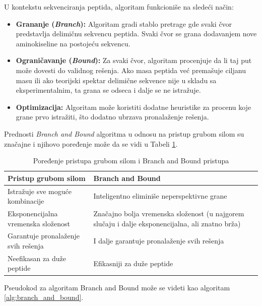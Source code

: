 \documentclass[12pt,oneside]{memoir}
\begin{document}
U kontekstu sekvenciranja peptida, algoritam funkcioniše na sledeći način:
\begin{itemize}
    \item \textbf{Grananje (\emph{Branch}):} Algoritam gradi stablo pretrage gde svaki čvor predstavlja delimičnu sekvencu peptida. Svaki čvor se grana dodavanjem nove aminokiseline na postojeću sekvencu.
    \item \textbf{Ograničavanje (\emph{Bound}):} Za svaki čvor, algoritam procenjuje da li taj put može dovesti do validnog rešenja. Ako masa peptida već premašuje ciljanu masu ili ako teorijski spektar delimične sekvence nije u skladu sa eksperimentalnim, ta grana se odseca i dalje se ne istražuje.
    \item \textbf{Optimizacija:} Algoritam može koristiti dodatne heuristike za procenu koje grane prvo istražiti, što dodatno ubrzava pronalaženje rešenja.
\end{itemize}

Prednosti \emph{Branch and Bound} algoritma u odnosu na pristup grubom silom su značajne i njihovo poređenje može da se vidi u Tabeli \ref{tab:branch_vs_brute}.

\begin{table}[H]
\centering
\renewcommand{\arraystretch}{1.5}
\begin{tabular}{|>{\raggedright\arraybackslash}m{}|>{\raggedright\arraybackslash}m{}|}
\hline
\textbf{Pristup grubom silom} & \textbf{Branch and Bound} \\
\hline
Istražuje sve moguće kombinacije & Inteligentno eliminiše neperspektivne grane \\
\hline
Eksponencijalna vremenska složenost & Značajno bolja vremenska složenost (u najgorem slučaju i dalje eksponencijalna, ali znatno brža) \\
\hline
Garantuje pronalaženje svih rešenja & I dalje garantuje pronalaženje svih rešenja \\
\hline
Neefikasan za duže peptide & Efikasniji za duže peptide \\
\hline
\end{tabular}
\caption{Poređenje pristupa grubom silom i Branch and Bound pristupa}
\label{tab:branch_vs_brute}
\end{table}

Pseudokod za algoritam Branch and Bound može se videti kao algoritam \ref{alg:branch_and_bound}.
\end{document}
